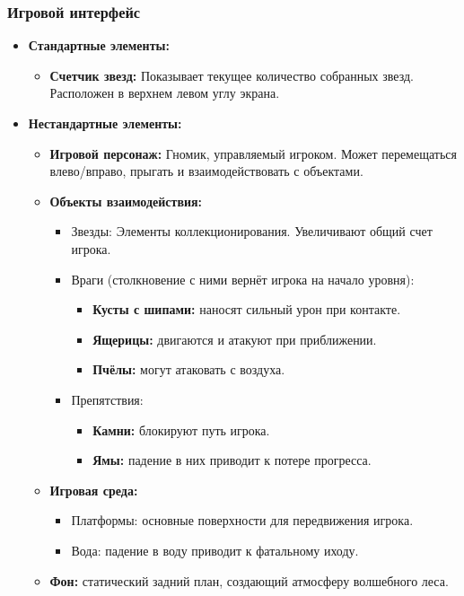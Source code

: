 \documentclass{article}
\begin{document}
\subsubsection{Игровой интерфейс}
\begin{itemize}
    \item \textbf{Стандартные элементы:}
    \begin{itemize}
        \item \textbf{Счетчик звезд:} Показывает текущее количество собранных звезд. Расположен в верхнем левом углу экрана.
    \end{itemize}
    \item \textbf{Нестандартные элементы:}
    \begin{itemize}
        \item \textbf{Игровой персонаж:} Гномик, управляемый игроком. Может перемещаться влево/вправо, прыгать и взаимодействовать с объектами.
        \item \textbf{Объекты взаимодействия:}
        \begin{itemize}
            \item Звезды: Элементы коллекционирования. Увеличивают общий счет игрока.
            \item Враги (столкновение с ними вернёт игрока на начало уровня):
            \begin{itemize}
                \item \textbf{Кусты с шипами:} наносят сильный урон при контакте.
                \item \textbf{Ящерицы:} двигаются и атакуют при приближении.
                \item \textbf{Пчёлы:} могут атаковать с воздуха.
            \end{itemize}
	    \item Препятствия:
            \begin{itemize}
                \item \textbf{Камни:} блокируют путь игрока.
                \item \textbf{Ямы:} падение в них приводит к потере прогресса.
            \end{itemize}
        \end{itemize}
        \item \textbf{Игровая среда:}
        \begin{itemize}
            \item Платформы: основные поверхности для передвижения игрока.
            \item Вода: падение в воду приводит к фатальному иходу.
        \end{itemize}
        \item \textbf{Фон:} статический задний план, создающий атмосферу волшебного леса.
    \end{itemize}
\end{itemize}
\end{document}
